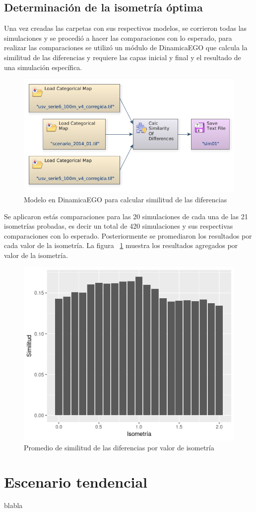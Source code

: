 \documentclass[12pt,a4paper,oldfontcommands]{article}
\begin{document}
\subsection{Determinación de la isometría óptima}
Una vez creadas las carpetas con sus respectivos modelos, se corrieron todas las simulaciones y se procedió a hacer las comparaciones con lo esperado, para realizar las comparaciones se utilizó un módulo de DinamicaEGO que calcula la similitud de las diferencias y requiere las capas inicial y final y el resultado de una simulación específica.
\begin{figure}[h]
	\centering
	\includegraphics[width=1\textwidth]{./figuras/similitud.png}
	\caption{Modelo en DinamicaEGO para calcular similitud de las diferencias}
\end{figure}
\bigskip
Se aplicaron estás comparaciones para las 20 simulaciones de cada una de las 21 isometrías probadas, es decir un total de 420 simulaciones y sus respectivas comparaciones con lo esperado. Posteriormente se promediaron los resultados por cada valor de la isometría. La figura ~\ref{fig:isometria} muestra los resultados agregados por valor de la isometría.
\begin{figure}[h]
	\centering
	\includegraphics[width=1\textwidth]{./figuras/similitud_isometria.png}
	\caption{Promedio de similitud de las diferencias por valor de isometría}
	\label{fig:isometria}
\end{figure}
\bigskip

\section{Escenario tendencial}
blabla

\newpage
\printbibliography
\end{document}

